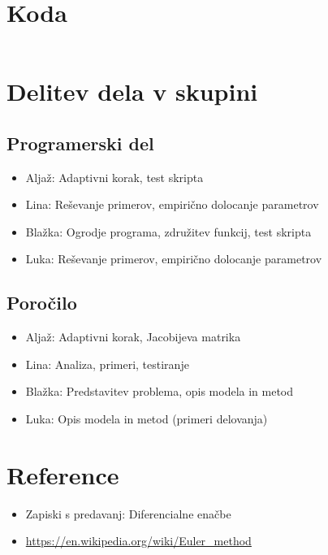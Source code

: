 \documentclass[12pt]{article}
\begin{document}
\section{Koda}
\begin{lstlisting}[language=Octave]

\end{lstlisting}
\newpage
\section{Delitev dela v skupini}
\subsection{Programerski del}
\begin{itemize}
	\item Aljaž: Adaptivni korak, test skripta
	\item Lina: Re\v{s}evanje primerov, empiri\v{c}no dolocanje parametrov
	\item Blažka: Ogrodje programa, zdru\v{z}itev funkcij, test skripta
	\item Luka: Re\v{s}evanje primerov, empiri\v{c}no dolocanje parametrov
\end{itemize}
\subsection{Poro\v{c}ilo}
\begin{itemize}
	\item Aljaž: Adaptivni korak, Jacobijeva matrika
	\item Lina: Analiza, primeri, testiranje
	\item Blažka: Predstavitev problema, opis modela in metod
	\item Luka: Opis modela in metod (primeri delovanja)
\end{itemize}
\section{Reference}
\begin{itemize}
	\item Zapiski s predavanj: Diferencialne ena\v{c}be
	\item \url{https://en.wikipedia.org/wiki/Euler_method}
\end{itemize}
\end{document}
